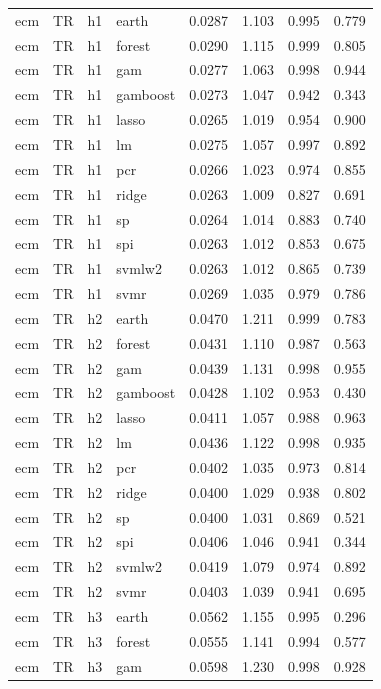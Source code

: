 \begin{ThreePartTable}
\begin{longtable}[t]{llclcccc}
\addlinespace
ecm & TR & h1 & earth & 0.0287 & 1.103 & 0.995 & 0.779\\
ecm & TR & h1 & forest & 0.0290 & 1.115 & 0.999 & 0.805\\
ecm & TR & h1 & gam & 0.0277 & 1.063 & 0.998 & 0.944\\
ecm & TR & h1 & gamboost & 0.0273 & 1.047 & 0.942 & 0.343\\
ecm & TR & h1 & lasso & 0.0265 & 1.019 & 0.954 & 0.900\\
ecm & TR & h1 & lm & 0.0275 & 1.057 & 0.997 & 0.892\\
ecm & TR & h1 & pcr & 0.0266 & 1.023 & 0.974 & 0.855\\
ecm & TR & h1 & ridge & 0.0263 & 1.009 & 0.827 & 0.691\\
ecm & TR & h1 & sp & 0.0264 & 1.014 & 0.883 & 0.740\\
ecm & TR & h1 & spi & 0.0263 & 1.012 & 0.853 & 0.675\\
ecm & TR & h1 & svmlw2 & 0.0263 & 1.012 & 0.865 & 0.739\\
ecm & TR & h1 & svmr & 0.0269 & 1.035 & 0.979 & 0.786\\
\addlinespace
ecm & TR & h2 & earth & 0.0470 & 1.211 & 0.999 & 0.783\\
ecm & TR & h2 & forest & 0.0431 & 1.110 & 0.987 & 0.563\\
ecm & TR & h2 & gam & 0.0439 & 1.131 & 0.998 & 0.955\\
ecm & TR & h2 & gamboost & 0.0428 & 1.102 & 0.953 & 0.430\\
ecm & TR & h2 & lasso & 0.0411 & 1.057 & 0.988 & 0.963\\
ecm & TR & h2 & lm & 0.0436 & 1.122 & 0.998 & 0.935\\
ecm & TR & h2 & pcr & 0.0402 & 1.035 & 0.973 & 0.814\\
ecm & TR & h2 & ridge & 0.0400 & 1.029 & 0.938 & 0.802\\
ecm & TR & h2 & sp & 0.0400 & 1.031 & 0.869 & 0.521\\
ecm & TR & h2 & spi & 0.0406 & 1.046 & 0.941 & 0.344\\
ecm & TR & h2 & svmlw2 & 0.0419 & 1.079 & 0.974 & 0.892\\
ecm & TR & h2 & svmr & 0.0403 & 1.039 & 0.941 & 0.695\\
\addlinespace
ecm & TR & h3 & earth & 0.0562 & 1.155 & 0.995 & 0.296\\
ecm & TR & h3 & forest & 0.0555 & 1.141 & 0.994 & 0.577\\
ecm & TR & h3 & gam & 0.0598 & 1.230 & 0.998 & 0.928\\

\end{longtable}
\end{ThreePartTable}
